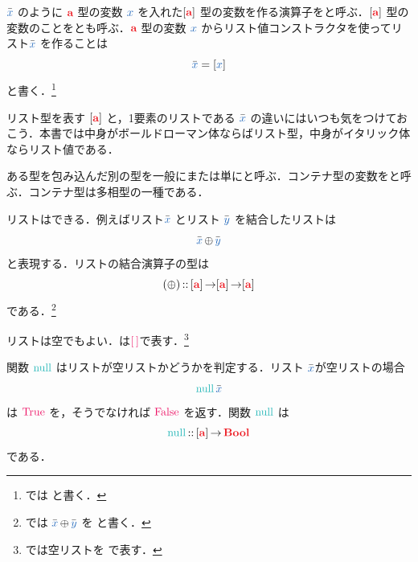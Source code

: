 \documentclass[a5paper,twoside,fleqn,draft]{jsbook}
\begin{document}
$\hListVarWith{x}$ のように $\hTypeName{a}$ 型の変数 $\hVar{x}$ を入れた$\hListConstruct{\hTypeName{a}}$ 型の変数を作る演算子をと呼ぶ．$\hListConstruct{\hTypeName{a}}$ 型の変数のことをとも呼ぶ．$\hTypeName{a}$ 型の変数 $\hVar{x}$ からリスト値コンストラクタを使ってリスト$\hListVarWith{x}$ を作ることは
\begin{equation}
  \hListVarWith{x}
  =\hListWith{\hVar{x}}
\end{equation}
と書く．\footnote{\haskell では  と書く．}

リスト型を表す $\hListConstruct{\hTypeName{a}}$ と，1要素のリストである $\hListVarWith{x}$ の違いにはいつも気をつけておこう．本書では中身がボールドローマン体ならばリスト型，中身がイタリック体ならリスト値である．

ある型を包み込んだ別の型を一般にまたは単にと呼ぶ．コンテナ型の変数をと呼ぶ．コンテナ型は多相型の一種である．


\separator

リストはできる．例えばリスト$\hListVarWith{x}$ とリスト
$\hListVarWith{y}$ を結合したリストは
\begin{equation}
  \hListVarWith{x}\hAppend\hListVarWith{y}
\end{equation}
と表現する．リストの結合演算子の型は
\begin{equation}
  (\hAppend)
  \hIsTypeOf{}\hListConstruct{\hTypeName{a}}\hFunctionArrow\hListConstruct{\hTypeName{a}}\hFunctionArrow\hListConstruct{\hTypeName{a}}
\end{equation}
である．\footnote{\haskell では $\hListVarWith{x}\hAppend\hListVarWith{y}$ を  と書く．}

\separator

リストは空でもよい．は$\mEmptyList$で表す．\footnote{\haskell では空リストを \code{[]} で表す．}

関数 $\hNull$ はリストが空リストかどうかを判定する．リスト $\hListVarWith{x}$が空リストの場合
\begin{equation}
  \hNull\hListVarWith{x}
\end{equation}
は $\hTrue$ を，そうでなければ $\hFalse$ を返す．関数 $\hNull$ は
\begin{equation}
\hNull\hIsTypeOf{}\hListConstruct{\hTypeName{a}}\hFunctionArrow\hBool
\end{equation}
である．
\end{document}
